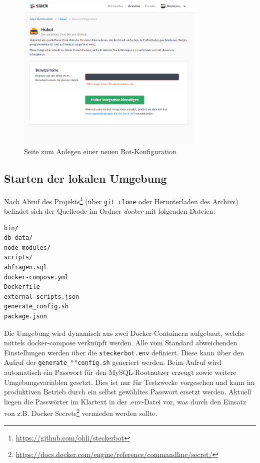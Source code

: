 \begin{figure}[H]
    \centering
    \includegraphics[width=0.8\textwidth]{img/hubot-int.png}
    \caption{Seite zum Anlegen einer neuen Bot-Konfiguration}
    \label{img:hubot-int}
\end{figure}

\subsection{Starten der lokalen Umgebung}
Nach Abruf des Projekts\footnote{\url{https://github.com/ohli/steckerbot}}
(über \texttt{git clone} oder Herunterladen des Archivs) befindet sich der Quellcode im Ordner \textit{docker} mit folgenden Dateien:

\begin{verbatim}
bin/
db-data/
node_modules/
scripts/
abfragen.sql
docker-compose.yml
Dockerfile
external-scripts.json
generate_config.sh
package.json
\end{verbatim}

Die Umgebung wird dynamisch aus zwei Docker-Containern aufgebaut, welche mittels docker-compose verknüpft werden. Alle vom Standard abweichenden Einstellungen werden über die \texttt{steckerbot.env} definiert. Diese kann über den Aufruf der \texttt{generate\_""config.sh} generiert werden. Beim Aufruf wird automatisch ein Passwort für den MySQL-Rootnutzer erzeugt sowie weitere Umgebungsvariablen gesetzt. Dies ist nur für Testzwecke vorgesehen und kann im produktiven Betrieb durch ein selbst gewähltes Passwort ersetzt werden. Aktuell liegen die Passwörter im Klartext in der .env-Datei vor, was durch den Einsatz von z.B. Docker Secrets\footnote{\url{https://docs.docker.com/engine/reference/commandline/secret/}} vermieden werden sollte.

